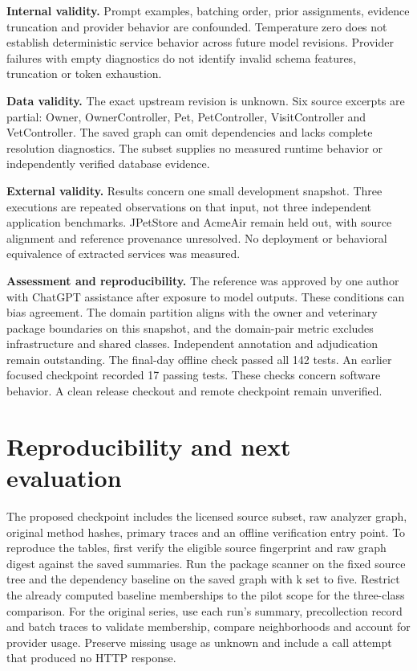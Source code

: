 \textbf{Internal validity.} Prompt examples, batching order, prior assignments, evidence truncation and provider behavior are confounded. Temperature zero does not establish deterministic service behavior across future model revisions. Provider failures with empty diagnostics do not identify invalid schema features, truncation or token exhaustion.

\textbf{Data validity.} The exact upstream revision is unknown. Six source excerpts are partial: Owner, OwnerController, Pet, PetController, VisitController and VetController. The saved graph can omit dependencies and lacks complete resolution diagnostics. The subset supplies no measured runtime behavior or independently verified database evidence.

\textbf{External validity.} Results concern one small development snapshot. Three executions are repeated observations on that input, not three independent application benchmarks. JPetStore and AcmeAir remain held out, with source alignment and reference provenance unresolved. No deployment or behavioral equivalence of extracted services was measured.

\textbf{Assessment and reproducibility.} The reference was approved by one author with ChatGPT assistance after exposure to model outputs. These conditions can bias agreement. The domain partition aligns with the owner and veterinary package boundaries on this snapshot, and the domain-pair metric excludes infrastructure and shared classes. Independent annotation and adjudication remain outstanding. The final-day offline check passed all 142 tests. An earlier focused checkpoint recorded 17 passing tests. These checks concern software behavior. A clean release checkout and remote checkpoint remain unverified.

\section{Reproducibility and next evaluation}

The proposed checkpoint includes the licensed source subset, raw analyzer graph, original method hashes, primary traces and an offline verification entry point. To reproduce the tables, first verify the eligible source fingerprint and raw graph digest against the saved summaries. Run the package scanner on the fixed source tree and the dependency baseline on the saved graph with k set to five. Restrict the already computed baseline memberships to the pilot scope for the three-class comparison. For the original series, use each run's summary, precollection record and batch traces to validate membership, compare neighborhoods and account for provider usage. Preserve missing usage as unknown and include a call attempt that produced no HTTP response.

